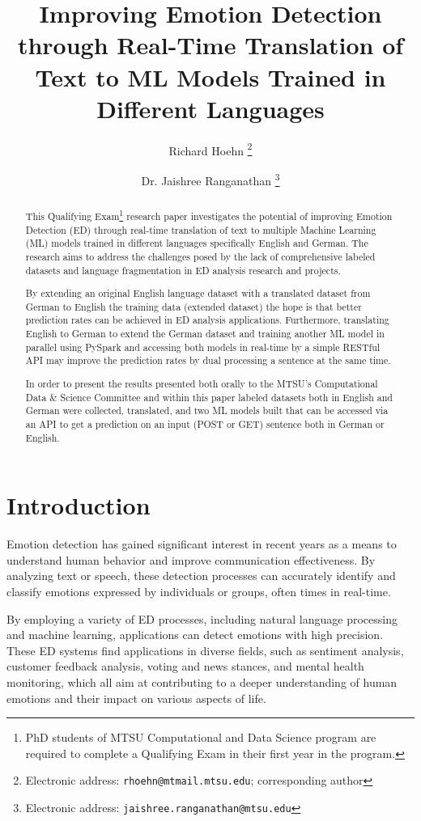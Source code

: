 \documentclass[11pt]{article}
\title{Improving Emotion Detection through Real-Time Translation of Text to ML Models Trained in Different Languages}
\author{Richard Hoehn%
	\thanks{Electronic address: \texttt{rhoehn@mtmail.mtsu.edu}; corresponding author}}
\affil{Middle Tennessee State University}
\author{Dr. Jaishree Ranganathan%
	\thanks{Electronic address: \texttt{jaishree.ranganathan@mtsu.edu}}}
\affil{Middle Tennessee State University}
\begin{document}
\maketitle

\begin{abstract}
This Qualifying Exam\footnote{PhD students of MTSU Computational and Data Science program are required to complete a Qualifying Exam in their first year in the program.} research paper investigates the potential of improving Emotion Detection (ED) through real-time translation of text to multiple Machine Learning (ML) models trained in different languages specifically  English and German. The research aims to address the challenges posed by the lack of comprehensive labeled datasets and language fragmentation in ED analysis research and projects. 

By extending an original English language dataset with a translated dataset from German to English the training data (extended dataset) the hope is that better prediction rates can be achieved in ED analysis applications. Furthermore, translating English to German to extend the German dataset and training another ML model in parallel using PySpark and accessing both models in real-time by a simple RESTful API may improve the prediction rates by dual processing a sentence at the same time.

In order to present the results presented both orally to the MTSU's Computational Data \& Science Committee and within this paper labeled datasets both in English and German were collected, translated, and two ML models built that can be accessed via an API to get a prediction on an input (POST or GET) sentence both in German or English.
\end{abstract}
\clearpage

\tableofcontents

\clearpage
\section{Introduction}

Emotion detection has gained significant interest in recent years as a means to understand human behavior and improve communication effectiveness. By analyzing text or speech, these detection processes can accurately identify and classify emotions expressed by individuals or groups, often times in real-time.

By employing a variety of ED processes, including natural language processing and machine learning, applications can detect emotions with high precision. These ED systems find applications in diverse fields, such as sentiment analysis, customer feedback analysis, voting and news stances, and mental health monitoring, which all aim at contributing to a deeper understanding of human emotions and their impact on various aspects of life.
\end{document}
